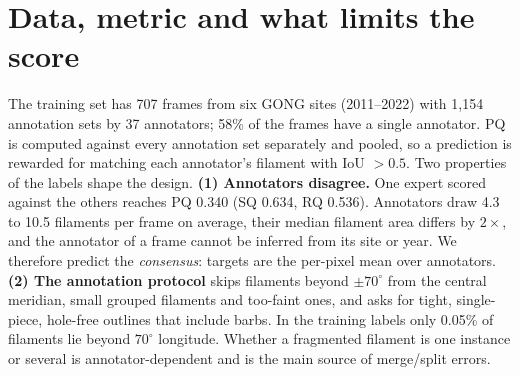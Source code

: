 
\begin{abstract}
We segment solar filaments in full-disk GONG H$\alpha$ images in two stages: dense U-Net probability
maps at native resolution, then learned instance selection and per-instance refinement. Stage 1
averages ConvNeXt U-Nets trained on native-resolution crops ($512^2$ and $768^2$) with full-disk
$1024^2$ models, all trained on soft annotator-consensus targets. Stage 2 builds a tree of candidate
instances from 10 threshold levels, scores each with a gradient-boosted model and a crop refiner aligned
with the filament's principal axis, and keeps the subset that maximises expected panoptic quality. With
5-fold time-grouped cross-validation the accuracy configuration (8 stage-1 members) reaches an
out-of-fold PQ of 0.467 at 18.7\,s per image and the efficient configuration (3 members) 0.462 at
3.3\,s per image on one GPU (one expert scored against the other experts: 0.340). Both score 0.40 on
the public leaderboard, using only the supplied test image.
\end{abstract}

\section{Data, metric and what limits the score}
The training set has 707 frames from six GONG sites (2011--2022) with 1,154 annotation sets by 37
annotators; 58\% of the frames have a single annotator. PQ is computed against every annotation set
separately and pooled, so a prediction is rewarded for matching each annotator's filament with
IoU $>0.5$. Two properties of the labels shape the design.
\textbf{(1) Annotators disagree.} One expert scored against the others reaches PQ 0.340 (SQ 0.634,
RQ 0.536). Annotators draw 4.3 to 10.5 filaments per frame on average, their median filament area
differs by $2\times$, and the annotator of a frame cannot be inferred from its site or year.
We therefore predict the \emph{consensus}: targets are the per-pixel mean over annotators.
\textbf{(2) The annotation protocol} \cite{magfilo} skips filaments beyond $\pm70^\circ$ from the
central meridian, small grouped filaments and too-faint ones, and asks for tight, single-piece,
hole-free outlines that include barbs. In the training labels only 0.05\% of filaments lie beyond
$70^\circ$ longitude. Whether a fragmented filament is one instance or several is annotator-dependent
and is the main source of merge/split errors.

